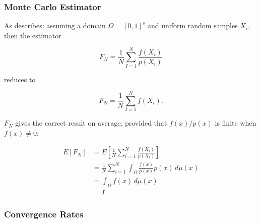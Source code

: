 \subsubsection{Monte Carlo Estimator}

As \textcite{veach1998} describes: assuming a domain $\Omega = [0, 1]^s$ and uniform random samples $X_i$, then the estimator

\[
F_N = \frac{1}{N} \sum_{I=1}^N \frac{f(X_i)}{p(X_i)}
\]

reduces to

\[
F_N = \frac{1}{N} \sum_{I=1}^N f(X_i).
\]

$F_N$ gives the correct result on average, provided that $f(x)/p(x)$ is finite when $f(x) \ne 0$:

\begin{align}
E[F_N] &= E\left[\frac{1}{N}\sum_{i=1}^N \frac{f(X_i)}{p(X_i)}\right] \\
&= \frac{1}{N} \sum_{i=1}^N \int_\Omega \frac{f(x)}{p(x)}p(x)\,d\mu(x) \\
&= \int_\Omega f(x)\,d\mu(x) \\
&= I
\end{align}

\subsubsection{Convergence Rates}

